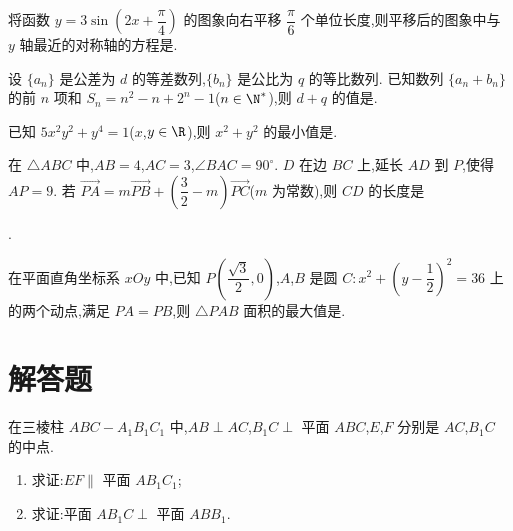 \begin{problem}
将函数 \(y=3\sin\!\left(2x+\dfrac\pi4\right)\) 的图象向右平移 \(\dfrac\pi6\) 个单位长度,则平移后的图象中与 \(y\) 轴最近的对称轴的方程是\fillinblank{}.
\end{problem}

\begin{problem}
设 \(\{a_n\}\) 是公差为 \(d\) 的等差数列,\(\{b_n\}\) 是公比为 \(q\) 的等比数列. 已知数列 \(\{a_n+b_n\}\) 的前 \(n\) 项和 \(S_n=n^2-n+2^n-1\)(\(n\in\N^*\)),则 \(d+q\) 的值是\fillinblank{}.
\end{problem}

\begin{problem}
已知 \(5x^2y^2+y^4=1\)(\(x\),\(y\in\R\)),则 \(x^2+y^2\) 的最小值是\fillinblank{}.
\end{problem}

\begin{problem}
在 \(\triangle ABC\) 中,\(AB=4\),\(AC=3\),\(\angle BAC=90^\circ\). \(D\) 在边 \(BC\) 上,延长 \(AD\) 到 \(P\),使得 \(AP=9\). 若 \(\overrightarrow{PA}=m\overrightarrow{PB}+\left(\dfrac32-m\right)\overrightarrow{PC}\)(\(m\) 为常数),则 \(CD\) 的长度是


\fillinblank{}.
\end{problem}

\begin{problem}
在平面直角坐标系 \(xOy\) 中,已知 \(P\!\left(\dfrac{\sqrt3}{2},0\right)\),\(A\),\(B\) 是圆 \(C:x^2+\left(y-\dfrac12\right)^2=36\) 上的两个动点,满足 \(PA=PB\),则 \(\triangle PAB\) 面积的最大值是\fillinblank{}.
\end{problem}

\section{解答题}

\begin{problem}
在三棱柱 \(ABC-A_1B_1C_1\) 中,\(AB\perp AC\),\(B_1C\perp\) 平面 \(ABC\),\(E\),\(F\) 分别是 \(AC\),\(B_1C\) 的中点.

\begin{enumerate}
\item 求证:\(EF\parallel\) 平面 \(AB_1C_1\);
\item 求证:平面 \(AB_1C\perp\) 平面 \(ABB_1\).
\end{enumerate}

\end{problem}

